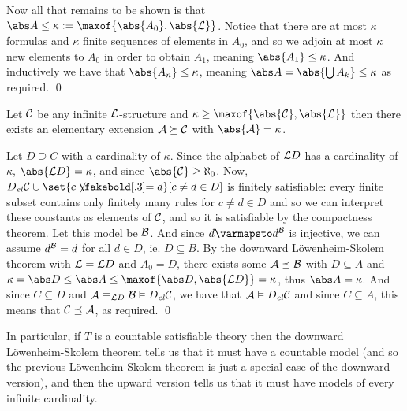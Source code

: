 Now all that remains to be shown is that $\abs A\leq\kappa\coloneqq\maxof{\abs{A_0},\abs{{\cal L}}}$.
Notice that there are at most $\kappa$ formulas and $\kappa$ finite sequences of elements in $A_0$, and so we adjoin at most $\kappa$ new elements to $A_0$ in order to obtain $A_1$, meaning
$\abs{A_1}\leq\kappa$.
And inductively we have that $\abs{A_n}\leq\kappa$, meaning $\abs A=\abs{\bigcup A_k}\leq\kappa$ as required.
\qed

\bthrm[title=Upward L\"owenheim-Skolem Theorem, name=uplowskol]

    Let ${\cal C}$ be any infinite ${\cal L}$-structure and $\kappa\geq\maxof{\abs{{\cal C}},\abs{{\cal L}}}$ then there exists an elementary extension ${\cal A}\succeq{\cal C}$ with $\abs{{\cal A}}=\kappa$.

\ethrm

Let $D\supseteq C$ with a cardinality of $\kappa$.
Since the alphabet of ${\cal L}D$ has a cardinality of $\kappa$, $\abs{{\cal L}D}=\kappa$, and since $\abs{{\cal C}}\geq\aleph_0$.
Now, $D_{\it el}{\cal C}\cup\set{c\neqb d}[c\neq d\in D]$ is finitely satisfiable: every finite subset contains only finitely many rules for $c\neq d\in D$ and so we can interpret these constants as
elements of ${\cal C}$, and so it is satisfiable by the compactness theorem.
Let this model be ${\cal B}$.
And since $d\varmapsto d^{\cal B}$ is injective, we can assume $d^{\cal B}=d$ for all $d\in D$, ie. $D\subseteq B$.
By the downward L\"owenheim-Skolem theorem with ${\cal L}={\cal L}D$ and $A_0=D$, there exists some ${\cal A}\preceq{\cal B}$ with $D\subseteq A$ and
$\kappa=\abs D\leq\abs A\leq\maxof{\abs D,\abs{{\cal L}D}}=\kappa$, thus $\abs A=\kappa$.
And since $C\subseteq D$ and ${\cal A}\equiv_{{\cal L}D}{\cal B}\vDash D_{\it el}{\cal C}$, we have that ${\cal A}\vDash D_{\it el}{\cal C}$ and since $C\subseteq A$, this means that
${\cal C}\preceq{\cal A}$, as required.
\qed

In particular, if $T$ is a countable satisfiable theory then the downward L\"owenheim-Skolem theorem tells us that it must have a countable model (and so the previous L\"owenheim-Skolem theorem is just a
special case of the downward version), and then the upward version tells us that it must have models of every infinite cardinality.

